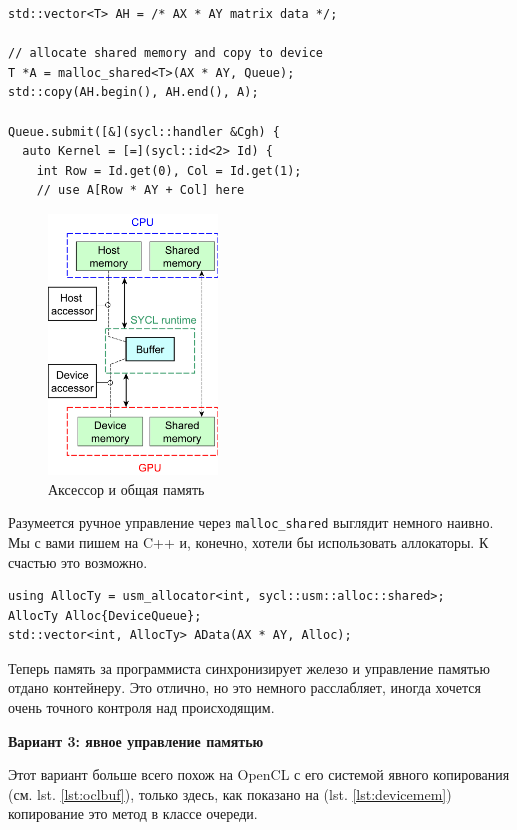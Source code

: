 \documentclass[a4paper,12pt,oneside]{article}
\begin{document}
\begin{lstlisting}[caption={Использование общей памяти},label={lst:sharedmem}]
std::vector<T> AH = /* AX * AY matrix data */;

// allocate shared memory and copy to device
T *A = malloc_shared<T>(AX * AY, Queue);
std::copy(AH.begin(), AH.end(), A);

Queue.submit([&](sycl::handler &Cgh) { 
  auto Kernel = [=](sycl::id<2> Id) {
    int Row = Id.get(0), Col = Id.get(1);
    // use A[Row * AY + Col] here
\end{lstlisting}

\begin{figure}
\centering
\includegraphics[width=0.4\textwidth]{pictures/sycl-device-and-shared-mem-v.pdf}
\caption{Аксессор и общая память}
\label{fig:sharedmem}
\end{figure}

Разумеется ручное управление через \lstinline!malloc_shared! выглядит немного наивно.
Мы с вами пишем на C++ и, конечно, хотели бы использовать аллокаторы. К счастью это возможно.

\begin{lstlisting}[caption={Аллокатор в общей памяти},label={lst:sharedalloc}]
using AllocTy = usm_allocator<int, sycl::usm::alloc::shared>;
AllocTy Alloc{DeviceQueue};
std::vector<int, AllocTy> AData(AX * AY, Alloc);
\end{lstlisting}

Теперь память за программиста синхронизирует железо и управление памятью отдано контейнеру.
Это отлично, но это немного расслабляет, иногда хочется очень точного контроля над происходящим.

\textbf{Вариант 3: явное управление памятью}

Этот вариант больше всего похож на OpenCL с его системой явного копирования (см. lst. \ref{lst:oclbuf}), только здесь, как показано на (lst. \ref{lst:devicemem}) копирование это метод в классе очереди.
\end{document}
